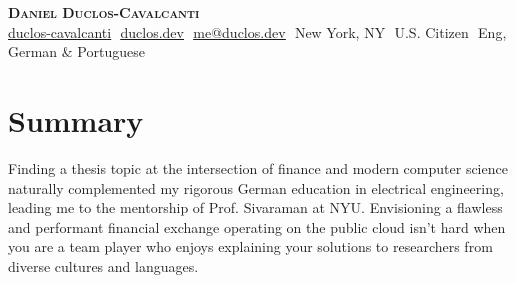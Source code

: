 \documentclass[letterpaper,11pt]{article}
\begin{document}
\begin{flushright}
\end{flushright}

\vspace{-5pt}

\begin{center}
    \textbf{\Huge \scshape Daniel Duclos-Cavalcanti} \\ \vspace{8pt}
    \small 
    \href{https://github.com/duclos-cavalcanti}{\underline{duclos-cavalcanti}} $  $
    \href{https://www.duclos.dev}{\underline{duclos.dev}} $  $
    \href{mailto:me@duclos.dev}{\underline{me@duclos.dev}} $ $
    New York, NY $ $
    U.S. Citizen $ $
    Eng, German \& Portuguese
\end{center}

\section{Summary}


\small{
Finding a thesis topic at the intersection of finance and modern computer science 
naturally complemented my rigorous German education in electrical engineering, 
leading me to the mentorship of Prof. Sivaraman at NYU. Envisioning a flawless and 
performant financial exchange operating on the public cloud isn't hard when you are a 
team player who enjoys explaining your solutions to researchers from diverse cultures and languages.
}
\end{document}
